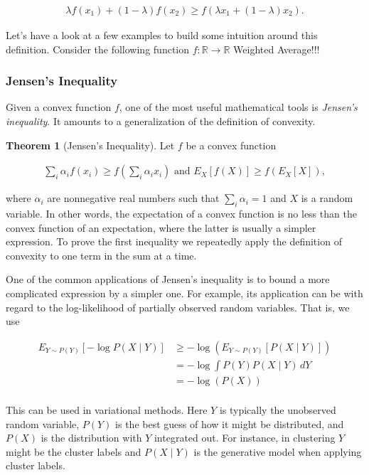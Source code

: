\documentclass[a4paper,12pt]{article}
\theoremstyle{definition}
\newtheorem*{theorem}{Theorem}
\newcommand{\R}{\mathbb{R}}
\begin{document}
\begin{align*}
    \lambda f(x_1) + (1-\lambda) f(x_2) \geq f(\lambda x_1 + (1-\lambda) x_2).
\end{align*}


Let's have a look at a few examples to build some intuition around this definition.
Consider the following function $f : \R \to \R$
Weighted Average!!!

\subsubsection*{Jensen's Inequality}
Given a convex function $f$, one of the most useful mathematical tools is \emph{Jensen's inequality}. It amounts to a generalization of the definition of convexity.
\begin{theorem}[Jensen's Inequality]
    Let $f$ be a convex function

    \begin{align*}
        \sum_i \alpha_i f(x_i)  \geq f\left(\sum_i \alpha_i x_i\right)    \text{ and }    E_X[f(X)]  \geq f\left(E_X[X]\right),
    \end{align*}

\end{theorem}

where $\alpha_i$ are nonnegative real numbers such that $\sum_i \alpha_i = 1$ and $X$ is
a random variable. In other words, the expectation of a convex function is no less than
the convex function of an expectation, where the latter is usually a simpler expression.
To prove the first inequality we repeatedly apply the definition of convexity to one term
in the sum at a time.

One of the common applications of Jensen's inequality is to bound a more complicated
expression by a simpler one. For example, its application can be with regard to the
log-likelihood of partially observed random variables. That is, we use


\begin{align*}
    E_{Y \sim P(Y)}[-\log P(X \mid Y)] & \geq -\log(E_{Y \sim P(Y)}[P(X \mid Y)]) \\
                                       & = -\log \int P(Y) P(X \mid Y) \,dY       \\
                                       & = -\log(P(X))                            \\
\end{align*}

This can be used in variational methods. Here $Y$ is typically the unobserved random variable, $P(Y)$ is the best guess of how it might be distributed, and $P(X)$
is the distribution with $Y$ integrated out. For instance, in clustering $Y$ might be the cluster labels and $P(X \mid Y)$ is the generative model when applying cluster labels.
\end{document}
